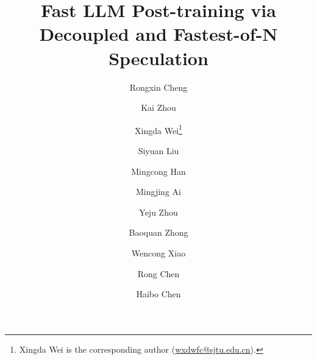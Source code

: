 \documentclass[10pt,sigplan,letterpaper,twocolumn]{article}
\begin{document}



\title{\Large \bf{
  Fast LLM Post-training via Decoupled and Fastest-of-N Speculation
}}

\author[1,2]{Rongxin Cheng}
\author[2]{Kai Zhou}
\author[1]{Xingda Wei\thanks{Xingda Wei is the corresponding author (\url{wxdwfc@sjtu.edu.cn}).}}
\author[1]{Siyuan Liu}
\author[1,2]{Mingcong Han}
\author[3]{Mingjing Ai}
\author[2]{Yeju Zhou}
\author[2]{Baoquan Zhong}
\author[2]{Wencong Xiao}
\author[1]{Rong Chen}
\author[1]{Haibo Chen}


\maketitle













% 





% 

\balance

\small{


}

\clearpage
%
\end{document}
